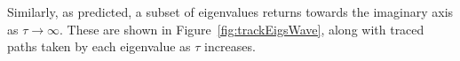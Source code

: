 \documentclass[10pt]{article}
\begin{document}
Similarly, as predicted, a subset of eigenvalues returns towards the imaginary axis as $\tau \rightarrow \infty$.  These are shown in Figure~\ref{fig:trackEigsWave}, along with traced paths taken by each eigenvalue as $\tau$ increases.  

\begin{figure}
\centering
{}
\hspace{2em}

\end{figure}
\end{document}
